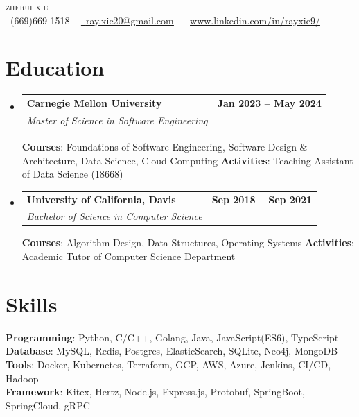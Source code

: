 \documentclass[letterpaper,11pt]{article}
\makeatletter
\newcommand{\resumeSubheading}[4]{
    \item
      \begin{tabular*}{1.0\textwidth}[t]{l@{\extracolsep{\fill}}r}
        \textbf{#1} & \textbf{\small #2} \\
        \textit{\small#3} & \textit{\small #4} \\
      \end{tabular*}
  }
\newcommand{\resumeSubHeadingListStart}{\begin{itemize}[leftmargin=0.0in,
  label={}]}
\newcommand{\resumeSubHeadingListEnd}{\end{itemize}}
\makeatother
\begin{document}
  \begin{center}
      {\LARGE \scshape zherui xie} \\
      \small
      \raisebox{-0.1\height}\faPhone\ (669)669-1518 ~
  \href{mailto:ray.xie20@gmail.com}{\raisebox{-0.2\height}\faEnvelope\
  \underline{ray.xie20@gmail.com}} ~ \raisebox{-0.1\height}\faLinkedin\
  \href{https://www.linkedin.com/in/rayxie9/}{www.linkedin.com/in/rayxie9/}
  \end{center}

  \section{Education}
  \large
    \resumeSubHeadingListStart
      \resumeSubheading
        {Carnegie Mellon University}{Jan 2023 -- May 2024}
        {Master of Science in Software Engineering}{}
         {\textbf{Courses}: Foundations of Software Engineering, Software
  Design \& Architecture, Data Science, Cloud Computing}{}
         {\textbf{Activities}: Teaching Assistant of Data Science (18668)}{}
      \resumeSubheading
        {University of California, Davis}{Sep 2018 -- Sep 2021}
        {Bachelor of Science in Computer Science}{}
         {\textbf{Courses}: Algorithm Design, Data Structures, Operating
  Systems}{}
         {\textbf{Activities}: Academic Tutor of Computer Science Department}{}
    \resumeSubHeadingListEnd

  \section{Skills}
   \begin{itemize}[leftmargin=0.15in, label={}]
  \small
  {\item{
      \textbf{Programming}{: Python, C/C++, Golang, Java, JavaScript(ES6),
  TypeScript}\\
      \textbf{Database}{: MySQL, Redis, Postgres, ElasticSearch, SQLite, Neo4j,
   MongoDB}\\
      \textbf{Tools}{: Docker, Kubernetes, Terraform, GCP, AWS, Azure, Jenkins,
   CI/CD, Hadoop}\\
      \textbf{Framework}{: Kitex, Hertz, Node.js, Express.js, Protobuf,
  SpringBoot, SpringCloud, gRPC}\\
  }}
   \end{itemize}
\end{document}
